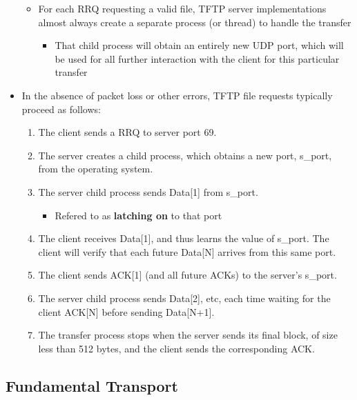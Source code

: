 \documentclass[11pt]{article}
\providecommand{\tightlist}{%
      \setlength{\itemsep}{0pt}\setlength{\parskip}{0pt}}
\begin{document}
\begin{itemize}
  \begin{itemize}
  \tightlist
  \item
    For each RRQ requesting a valid file, TFTP server implementations
    almost always create a separate process (or thread) to handle the
    transfer

    \begin{itemize}
    \tightlist
    \item
      That child process will obtain an entirely new UDP port, which
      will be used for all further interaction with the client for this
      particular transfer
    \end{itemize}
  \end{itemize}
\item
  In the absence of packet loss or other errors, TFTP file requests
  typically proceed as follows:

  \begin{enumerate}
  \def\labelenumi{\arabic{enumi}.}
  \tightlist
  \item
    The client sends a RRQ to server port 69.
  \item
    The server creates a child process, which obtains a new port,
    s\_port, from the operating system.
  \item
    The server child process sends Data{[}1{]} from s\_port.

    \begin{itemize}
    \tightlist
    \item
      Refered to as \textbf{latching on} to that port
    \end{itemize}
  \item
    The client receives Data{[}1{]}, and thus learns the value of
    s\_port. The client will verify that each future Data{[}N{]} arrives
    from this same port.
  \item
    The client sends ACK{[}1{]} (and all future ACKs) to the server's
    s\_port.
  \item
    The server child process sends Data{[}2{]}, etc, each time waiting
    for the client ACK{[}N{]} before sending Data{[}N+1{]}.
  \item
    The transfer process stops when the server sends its final block, of
    size less than 512 bytes, and the client sends the corresponding
    ACK.
  \end{enumerate}
\end{itemize}

    \subsection{Fundamental Transport}\label{fundamental-transport}
\end{document}
